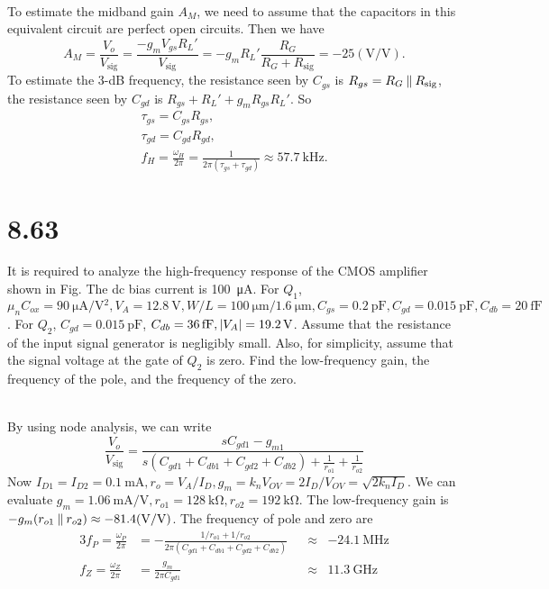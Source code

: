 \documentclass[12pt, a4paper]{article}
\begin{document}
\Ans \\
To estimate the midband gain $A_M$, we need to assume that the capacitors
in this equivalent circuit are perfect open circuits. Then we have
\[
  A_M = \frac{V_o}{V_\text{sig}}
  = \frac{-g_mV_{gs}R_L'}{V_\text{sig}}
  = -g_mR_L' \frac{R_G}{R_G+R_\text{sig}}
  = -25 (\si{\V/\V}).
\]
To estimate the 3-dB frequency, the resistance seen by
$C_{gs}$ is $R_{gs} = R_G \mathbin{\|} R_\text{sig}$, the resistance
seen by $C_{gd}$ is $R_{gs} + R_L' + g_mR_{gs}R_L'$. So
\begin{gather*}
  \tau_{gs} = C_{gs}R_{gs}, \\
  \tau_{gd} = C_{gd}R_{gd}, \\
  f_H = \frac{\omega_H}{2\pi} = \frac{1}{2\pi (\tau_{gs}+\tau_{gd})}
  \approx \SI{57.7}{\kHz}.
\end{gather*}

\section{8.63}
It is required to analyze the high-frequency response of the CMOS amplifier
shown in Fig. The dc bias current is \SI{100}{\uA}.
For $Q_1$, $\mu_nC_{ox} = \SI{90}{\uA/\V^2}, V_A = \SI{12.8}{\V},
W/L = \SI{100}{\um}/\SI{1.6}{\um}, C_{gs} = \SI{0.2}{\pF},
C_{gd} = \SI{0.015}{\pF}, C_{db} = \SI{20}{\fF}$. For $Q_2$,
$C_{gd} = \SI{0.015}{\pF}$, $C_{db} = \SI{36}{\fF}, \abs{V_A} = \SI{19.2}{\V}$.
Assume that the resistance of the input signal generator is negligibly small.
Also, for simplicity, assume that the signal voltage at the gate of $Q_2$
is zero. Find the low-frequency gain, the frequency of the pole, and the
frequency of the zero.

\Ans \\
By using node analysis, we can write
\[
  \frac{V_o}{V_\text{sig}} =
  \frac{sC_{gd1} - g_{m1}}{s(C_{gd1}+C_{db1}+C_{gd2}+C_{db2}) +
  \frac{1}{r_{o1}}+\frac{1}{r_{o2}}}
\]
Now $I_{D1} = I_{D2} = \SI{0.1}{\mA}, r_o = V_A/I_D,
g_m = k_nV_{OV} = 2I_D/V_{OV} = \sqrt{2k_nI_D}$. We can evaluate
$g_m = \SI{1.06}{\mA/\V}, r_{o1} = \SI{128}{\kohm}, r_{o2} = \SI{192}{\kohm}$.
The low-frequency gain is
$-g_m(r_{o1} \paral r_{o2})\approx -81.4(\si{\V/\V})$. The frequency of pole
and zero are
\begin{alignat*}{3}
  f_P = \frac{\omega_P}{2\pi} &=
  -\frac{1/r_{o1}+1/r_{o2}}{2\pi (C_{gd1}+C_{db1}+C_{gd2}+C_{db2})}
  && \approx & -\SI{24.1}{\MHz} \\
  f_Z = \frac{\omega_Z}{2\pi} &= \frac{g_m}{2\pi C_{gd1}}
  && \approx & \SI{11.3}{\GHz}
\end{alignat*}
\end{document}
